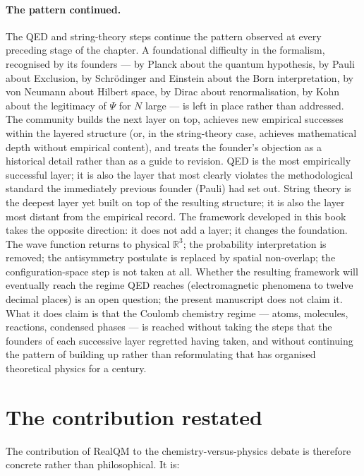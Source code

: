 \paragraph{The pattern continued.}
The QED and string-theory steps continue the pattern observed at every preceding stage of the chapter. A foundational difficulty in the formalism, recognised by its founders --- by Planck about the quantum hypothesis, by Pauli about Exclusion, by Schr\"odinger and Einstein about the Born interpretation, by von Neumann about Hilbert space, by Dirac about renormalisation, by Kohn about the legitimacy of $\Psi$ for $N$ large --- is left in place rather than addressed. The community builds the next layer on top, achieves new empirical successes within the layered structure (or, in the string-theory case, achieves mathematical depth without empirical content), and treats the founder's objection as a historical detail rather than as a guide to revision. QED is the most empirically successful layer; it is also the layer that most clearly violates the methodological standard the immediately previous founder (Pauli) had set out. String theory is the deepest layer yet built on top of the resulting structure; it is also the layer most distant from the empirical record. The framework developed in this book takes the opposite direction: it does not add a layer; it changes the foundation. The wave function returns to physical $\mathbb{R}^3$; the probability interpretation is removed; the antisymmetry postulate is replaced by spatial non-overlap; the configuration-space step is not taken at all. Whether the resulting framework will eventually reach the regime QED reaches (electromagnetic phenomena to twelve decimal places) is an open question; the present manuscript does not claim it. What it does claim is that the Coulomb chemistry regime --- atoms, molecules, reactions, condensed phases --- is reached without taking the steps that the founders of each successive layer regretted having taken, and without continuing the pattern of building up rather than reformulating that has organised theoretical physics for a century.

\section{The contribution restated}\label{sec:contribution-restated}

The contribution of RealQM to the chemistry-versus-physics debate is therefore concrete rather than philosophical. It is:

